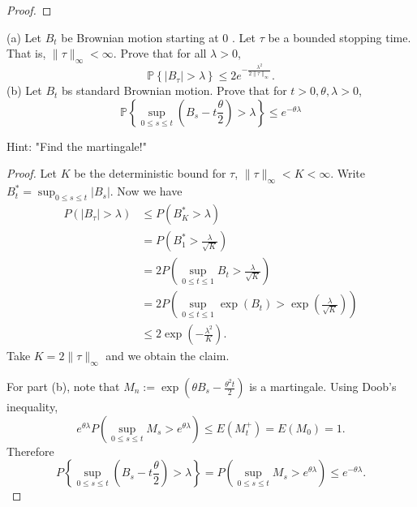 \begin{proof}
\end{proof}

\begin{problem}
	(a) Let $B_t$ be Brownian motion starting at 0 . Let $\tau$ be a bounded stopping time. That is, $\|\tau\|_{\infty}<\infty$. Prove that for all $\lambda>0$,
\[
\mathbb{P}\left\{\left|B_\tau\right|>\lambda\right\} \leq 2 e^{-\frac{\lambda^2}{2\|\tau\|_{\infty}}} .
\]
(b) Let $B_t$ bs standard Brownian motion. Prove that for $t>0, \theta, \lambda>0$,
\[
\mathbb{P}\left\{\sup _{0 \leq s \leq t}\left(B_s-t \frac{\theta}{2}\right)>\lambda\right\} \leq e^{-\theta \lambda}
\]

Hint: "Find the martingale!"
\end{problem}
\begin{proof}

	Let $K$ be the deterministic bound for $\tau$, $\|\tau\|_ \infty < K < \infty $. Write $B^*_t = \sup _{0 \le s \le t } |B_s|$.
	Now we have
	\begin{align*}
		P\left(|B_\tau| > \lambda\right)
		&\le P\left( B^*_K > \lambda \right)  \\
		&= P\left( B^*_1 > \frac{\lambda}{\sqrt{K} } \right)  \\
		&= 2 P\left( \sup _{0 \le t \le 1} B_t > \frac{\lambda}{\sqrt{K} } \right)  \\
		&= 2 P\left( \sup _{0 \le t \le 1} \exp(B_t) > \exp\left(\frac{\lambda}{\sqrt{K} }\right) \right)  \\
		&\leq 2 \exp\left( - \frac{\lambda^2}{K} \right) 
	.\end{align*}
	Take $K = 2 \|\tau\|_\infty $ and we obtain the claim.

	For part (b), note that $M_n := \exp\left( \theta B_s - \frac{\theta^2 t}{2} \right) $ is a martingale. Using Doob's inequality, 
	 \[
		e^{\theta \lambda} P\left( \sup _{0 \leq s \leq t} M_s > e^{\theta \lambda} \right)
		\le E\left( M_t^+  \right) = E(M_0) = 1 
	.\] 
	Therefore
	\[
	P\left\{\sup _{0 \leq s \leq t}\left(B_s-t \frac{\theta}{2}\right)>\lambda\right\} 
	= P\left( \sup _{0 \leq s \leq t} M_s > e^{\theta \lambda}\right) 
	\le  e^{- \theta \lambda}
	.\] 
\end{proof}

